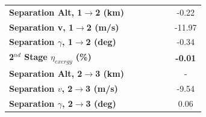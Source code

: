 \begin{table}[ht]
\begin{tabular}{l c c c c c c}
		\textbf{Separation Alt, 1$\rightarrow$2 (km)}
		& \firstsecondSeparationAltmSPARTANNinetyFiveNoReturn
		& \firstsecondSeparationAltmSPARTANNinetySevenFiveNoReturn
		& \firstsecondSeparationAltmSPARTANStandardNoReturn
		& \firstsecondSeparationAltmSPARTANOneHundredTwoFiveNoReturn
		& \firstsecondSeparationAltmSPARTANOneHundredFiveNoReturn
		&-0.22
		\\
		\textbf{Separation v, 1$\rightarrow$2 (m/s)}
		& \firstsecondSeparationvmSPARTANNinetyFiveNoReturn
		& \firstsecondSeparationvmSPARTANNinetySevenFiveNoReturn
		& \firstsecondSeparationvmSPARTANStandardNoReturn
		& \firstsecondSeparationvmSPARTANOneHundredTwoFiveNoReturn
		& \firstsecondSeparationvmSPARTANOneHundredFiveNoReturn
		&-11.97
		\\
		\textbf{Separation $\gamma$, 1$\rightarrow$2 (deg)}
		& \firstsecondSeparationgammamSPARTANNinetyFiveNoReturn
		& \firstsecondSeparationgammamSPARTANNinetySevenFiveNoReturn
		& \firstsecondSeparationgammamSPARTANStandardNoReturn
		& \firstsecondSeparationgammamSPARTANOneHundredTwoFiveNoReturn
		& \firstsecondSeparationgammamSPARTANOneHundredFiveNoReturn
		&-0.34
		\\
		\hline 
		\textbf{2$^{nd}$ Stage $\eta_{exergy}$ (\%)}
		& \textbf{\secondExergyEffmSPARTANNinetyFiveNoReturn}
		& \textbf{\secondExergyEffmSPARTANNinetySevenFiveNoReturn}
		& \textbf{\secondExergyEffmSPARTANStandardNoReturn}
		& \textbf{\secondExergyEffmSPARTANOneHundredTwoFiveNoReturn}
		& \textbf{\secondExergyEffmSPARTANOneHundredFiveNoReturn}
		& \textbf{-0.01}
		\\
	
		\textbf{Separation Alt, 2$\rightarrow$3 (km)}
		& \secondthirdSeparationAltmSPARTANNinetyFiveNoReturn
		& \secondthirdSeparationAltmSPARTANNinetySevenFiveNoReturn
		& \secondthirdSeparationAltmSPARTANStandardNoReturn
		& \secondthirdSeparationAltmSPARTANOneHundredTwoFiveNoReturn
		& \secondthirdSeparationAltmSPARTANOneHundredFiveNoReturn
		& -
		\\
		\textbf{Separation $v$, 2$\rightarrow$3 (m/s)}
		& \secondthirdSeparationvmSPARTANNinetyFiveNoReturn
		& \secondthirdSeparationvmSPARTANNinetySevenFiveNoReturn
		& \secondthirdSeparationvmSPARTANStandardNoReturn
		& \secondthirdSeparationvmSPARTANOneHundredTwoFiveNoReturn
		& \secondthirdSeparationvmSPARTANOneHundredFiveNoReturn
		&-9.54
		\\
		\textbf{Separation $\gamma$, 2$\rightarrow$3 (deg)}
		& \secondthirdSeparationgammamSPARTANNinetyFiveNoReturn
		& \secondthirdSeparationgammamSPARTANNinetySevenFiveNoReturn
		& \secondthirdSeparationgammamSPARTANStandardNoReturn
		& \secondthirdSeparationgammamSPARTANOneHundredTwoFiveNoReturn
		& \secondthirdSeparationgammamSPARTANOneHundredFiveNoReturn
		&0.06
		\\
	

\end{tabular}
\end{table}
